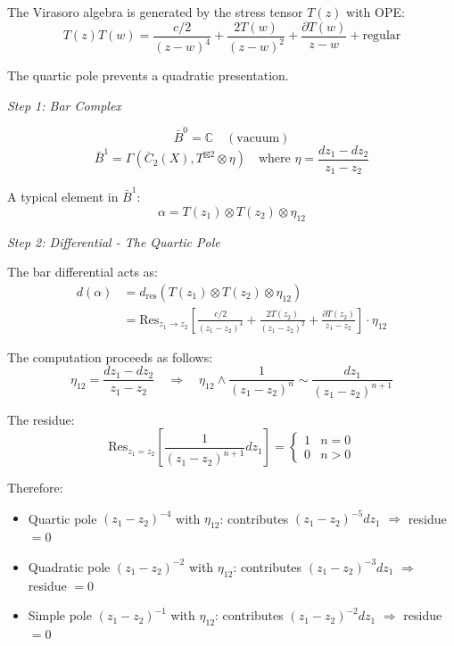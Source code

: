 \begin{example}
\label{ex:virasoro-completion-chiral}

The Virasoro algebra is generated by the stress tensor $T(z)$ with OPE:
\[T(z)T(w) = \frac{c/2}{(z-w)^4} + \frac{2T(w)}{(z-w)^2} + \frac{\partial T(w)}{z-w} + \text{regular}\]

The quartic pole prevents a quadratic presentation.

\medskip
\noindent\emph{Step 1: Bar Complex}

\[\bar{B}^0 = \mathbb{C} \quad (\text{vacuum})\]
\[\bar{B}^1 = \Gamma(\overline{C}_2(X), T^{\boxtimes 2} \otimes \eta) \quad \text{where } \eta = \frac{dz_1 - dz_2}{z_1 - z_2}\]

A typical element in $\bar{B}^1$:
\[\alpha = T(z_1) \otimes T(z_2) \otimes \eta_{12}\]

\medskip
\noindent\emph{Step 2: Differential - The Quartic Pole}

The bar differential acts as:
\begin{align*}
d(\alpha) &= d_{\text{res}}(T(z_1) \otimes T(z_2) \otimes \eta_{12}) \\
&= \text{Res}_{z_1 \to z_2}\left[\frac{c/2}{(z_1-z_2)^4} + \frac{2T(z_2)}{(z_1-z_2)^2} + \frac{\partial T(z_2)}{z_1-z_2}\right] \cdot \eta_{12}
\end{align*}

The computation proceeds as follows:
\[\eta_{12} = \frac{dz_1 - dz_2}{z_1 - z_2} \quad \Rightarrow \quad \eta_{12} \wedge \frac{1}{(z_1-z_2)^n} \sim \frac{dz_1}{(z_1-z_2)^{n+1}}\]

The residue:
\[\text{Res}_{z_1=z_2}\left[\frac{1}{(z_1-z_2)^{n+1}} dz_1\right] = \begin{cases} 1 & n = 0 \\ 0 & n > 0 \end{cases}\]

Therefore:
\begin{itemize}
\item Quartic pole $(z_1-z_2)^{-4}$ with $\eta_{12}$: contributes $(z_1-z_2)^{-5} dz_1$ $\Rightarrow$ residue $= 0$
\item Quadratic pole $(z_1-z_2)^{-2}$ with $\eta_{12}$: contributes $(z_1-z_2)^{-3} dz_1$ $\Rightarrow$ residue $= 0$
\item Simple pole $(z_1-z_2)^{-1}$ with $\eta_{12}$: contributes $(z_1-z_2)^{-2} dz_1$ $\Rightarrow$ residue $= 0$
\end{itemize}


\end{example}
